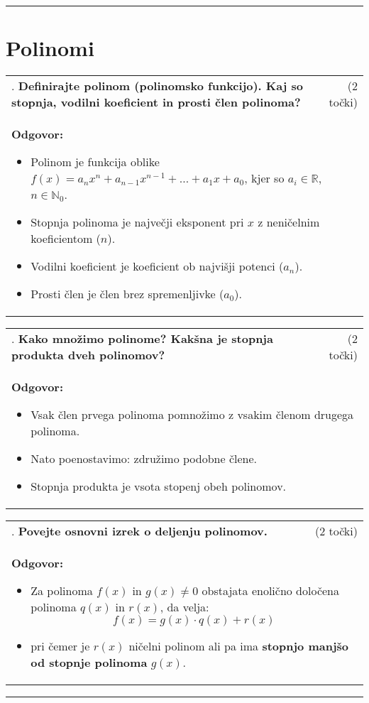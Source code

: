 \documentclass[12pt]{article}
\newcounter{vprasanje}[section]
\renewcommand{\thevprasanje}{\roman{vprasanje}}
\newcommand{\vprasanje}[2]{%
  \stepcounter{vprasanje}%
  \textbf{\thevprasanje}. \textbf{#1} & (#2) \\
}
\newcommand{\odgovor}[1]{%
  \multicolumn{2}{p{\dimexpr\textwidth-2\tabcolsep\relax}}{%
    \small \textbf{Odgovor:} #1%
  } \\[1em]%
}
\newcommand{\crta}{\rule{\textwidth}{0.4pt}}
\newcommand{\naslov}[1]{%
  \vspace{1em} 
  \section{#1}
  \addcontentsline{toc}{section}{\protect\numberline{}#1}%
}
\newcommand{\razmak}[1]{%
  \vspace{#1}
}
\begin{document}
\razmak{0.5em}


\crta

\naslov{Polinomi}

\begin{tabularx}{\textwidth}{X r}
\vprasanje{Definirajte polinom (polinomsko funkcijo). Kaj so stopnja, vodilni koeficient in prosti člen polinoma?}{2 točki}
\odgovor{
\begin{itemize}
  \item Polinom je funkcija oblike $f(x) = a_nx^n + a_{n-1}x^{n-1} + \dots + a_1x + a_0$, kjer so $a_i \in \mathbb{R}$, $n \in \mathbb{N}_0$.
  \item Stopnja polinoma je največji eksponent pri $x$ z neničelnim koeficientom ($n$).
  \item Vodilni koeficient je koeficient ob najvišji potenci ($a_n$).
  \item Prosti člen je člen brez spremenljivke ($a_0$).
\end{itemize}
}
\end{tabularx}

\begin{tabularx}{\textwidth}{X r}
\vprasanje{Kako množimo polinome? Kakšna je stopnja produkta dveh polinomov?}{2 točki}
\odgovor{
\begin{itemize}
  \item Vsak člen prvega polinoma pomnožimo z vsakim členom drugega polinoma.
  \item Nato poenostavimo: združimo podobne člene.
  \item Stopnja produkta je vsota stopenj obeh polinomov.
\end{itemize}
}
\end{tabularx}

\begin{tabularx}{\textwidth}{X r}
\vprasanje{Povejte osnovni izrek o deljenju polinomov.}{2 točki}
\odgovor{
\begin{itemize}
  \item Za polinoma $f(x)$ in $g(x) \ne 0$ obstajata enolično določena polinoma $q(x)$ in $r(x)$, da velja:
  \[
  f(x) = g(x) \cdot q(x) + r(x)
  \]
  \item pri čemer je $r(x)$ ničelni polinom ali pa ima \textbf{stopnjo manjšo od stopnje polinoma} $g(x)$.
\end{itemize}
}
\end{tabularx}

\razmak{0.5em}


\crta
\end{document}
